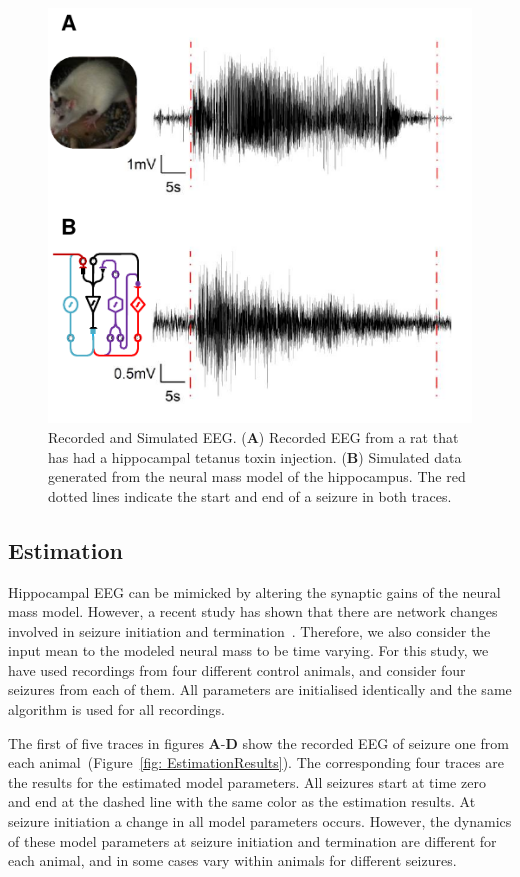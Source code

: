 \begin{figure}[ht]
 	\centering
 		\includegraphics{fig/EEG.pdf}
 	\caption{Recorded and Simulated EEG. (\textbf{A}) Recorded EEG from a rat that has had a hippocampal tetanus toxin injection. (\textbf{B}) Simulated data generated from the neural mass model of the hippocampus. The red dotted lines indicate the start and end of a seizure in both traces.}
 	\label{fig: EEG}
 \end{figure}

\subsection{Estimation}

Hippocampal EEG can be mimicked by altering the synaptic gains of the neural mass model. However, a recent study has shown that there are network changes involved in seizure initiation and termination~\citep{truccolo2011single}. Therefore, we also consider the input mean to the modeled neural mass to be time varying. For this study, we have used recordings from four different control animals, and consider four seizures from each of them. All parameters are initialised identically and the same algorithm is used for all recordings. 

The first of five traces in figures \textbf{A}-\textbf{D} show the recorded EEG of seizure one from each animal~(Figure~\ref{fig: EstimationResults}). The corresponding four traces are the results for the estimated model parameters. All seizures start at time zero and end at the dashed line with the same color as the estimation results. At seizure initiation a change in all model parameters occurs. However, the dynamics of these model parameters at seizure initiation and termination are different for each animal, and in some cases vary within animals for different seizures. 

